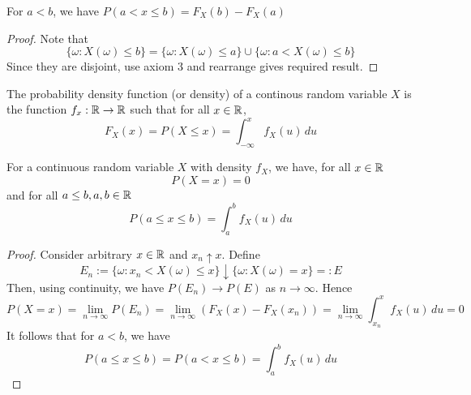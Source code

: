 \documentclass[11pt]{article}
\begin{document}
\begin{theorem}
  For \(a<b\), we have \(P(a<x\leq b)=F_X(b)-F_X(a)\)
\end{theorem}
\begin{proof}
  Note that \[\{\omega:X(\omega)\leq b\}=\{\omega:X(\omega)\leq a\}\cup \{\omega:a<X(\omega)\leq b\}\]
  Since they are disjoint, use axiom 3 and rearrange gives required result.
\end{proof}

\begin{definition}
  The probability density function (or density) of a continous random variable \(X\) is the function \(f_x:\mathbb{R}\to\mathbb{R}\) such that for all \(x\in\mathbb{R}\),
  \[F_X(x)=P(X\leq x)=\int_{-\infty}^{x}f_X(u)\,du\]
\end{definition}

\begin{theorem}
  For a continuous random variable \(X\) with density \(f_X\), we have, for all \(x\in\mathbb{R}\)
  \[P(X=x)=0\]
  and for all \(a\leq b, a,b\in\mathbb{R}\)
  \[P(a\leq x\leq b)=\int_{a}^{b}f_X(u)\,du\]
\end{theorem}
\begin{proof}
  Consider arbitrary \(x\in\mathbb{R}\) and \(x_n\uparrow x\). Define
  \[E_n:=\{\omega:x_n<X(\omega)\leq x\} \downarrow \{\omega:X(\omega)=x\}=:E\]
  Then, using continuity, we have \(P(E_n)\to P(E)\) as \(n\to\infty\). Hence 
  \[
    P(X=x) = \lim_{n\to\infty}P(E_n) = \lim_{n\to\infty}(F_X(x)-F_X(x_n)) = \lim_{n\to\infty}\int_{x_n}^{x}f_X(u)\,du=0
  \]
  It follows that for \(a<b\), we have
  \[P(a\leq x\leq b)=P(a<x\leq b)=\int_{a}^{b}f_X(u)\,du\]
\end{proof}

\end{document}
